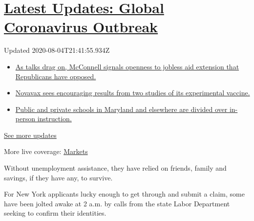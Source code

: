 \hypertarget{latest-updates-global-coronavirus-outbreak}{%
\section{\texorpdfstring{\href{https://www.nytimes3xbfgragh.onion/2020/08/04/world/coronavirus-cases.html?action=click\&pgtype=Article\&state=default\&region=MAIN_CONTENT_1\&context=storylines_live_updates}{Latest
Updates: Global Coronavirus
Outbreak}}{Latest Updates: Global Coronavirus Outbreak}}\label{latest-updates-global-coronavirus-outbreak}}

Updated 2020-08-04T21:41:55.934Z

\begin{itemize}
\tightlist
\item
  \href{https://www.nytimes3xbfgragh.onion/2020/08/04/world/coronavirus-cases.html?action=click\&pgtype=Article\&state=default\&region=MAIN_CONTENT_1\&context=storylines_live_updates\#link-2daa96b5}{As
  talks drag on, McConnell signals openness to jobless aid extension
  that Republicans have opposed.}
\item
  \href{https://www.nytimes3xbfgragh.onion/2020/08/04/world/coronavirus-cases.html?action=click\&pgtype=Article\&state=default\&region=MAIN_CONTENT_1\&context=storylines_live_updates\#link-1228a480}{Novavax
  sees encouraging results from two studies of its experimental
  vaccine.}
\item
  \href{https://www.nytimes3xbfgragh.onion/2020/08/04/world/coronavirus-cases.html?action=click\&pgtype=Article\&state=default\&region=MAIN_CONTENT_1\&context=storylines_live_updates\#link-4825b93}{Public
  and private schools in Maryland and elsewhere are divided over
  in-person instruction.}
\end{itemize}

\href{https://www.nytimes3xbfgragh.onion/2020/08/04/world/coronavirus-cases.html?action=click\&pgtype=Article\&state=default\&region=MAIN_CONTENT_1\&context=storylines_live_updates}{See
more updates}

More live coverage:
\href{https://www.nytimes3xbfgragh.onion/live/2020/08/04/business/stock-market-today-coronavirus?action=click\&pgtype=Article\&state=default\&region=MAIN_CONTENT_1\&context=storylines_live_updates}{Markets}

Without unemployment assistance, they have relied on friends, family and
savings, if they have any, to survive.

For New York applicants lucky enough to get through and submit a claim,
some have been jolted awake at 2 a.m. by calls from the state Labor
Department seeking to confirm their identities.

